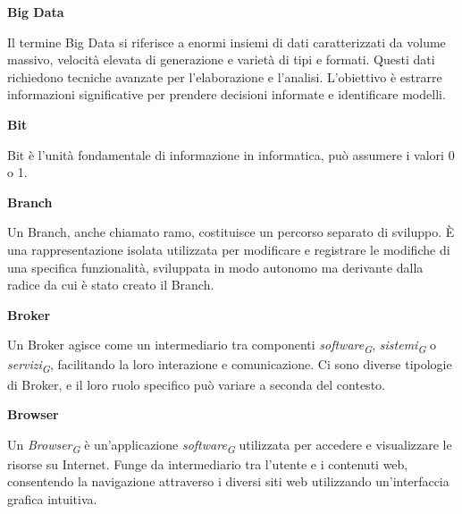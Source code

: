 \documentclass{article}
\begin{document}
\vspace{0.4cm}

\textbf{Big Data}

\vspace{0.1cm}

Il termine Big Data si riferisce a enormi insiemi di dati caratterizzati da volume massivo, velocità elevata di generazione e varietà di tipi e formati. Questi dati richiedono tecniche avanzate per l'elaborazione e l'analisi. L'obiettivo è estrarre informazioni significative per prendere decisioni informate e identificare modelli.

\vspace{0.4cm}

\textbf{Bit}

\vspace{0.1cm}

Bit è l'unità fondamentale di informazione in informatica, può assumere i valori 0 o 1. 

\vspace{0.4cm}

\textbf{Branch}

\vspace{0.1cm}

Un Branch, anche chiamato ramo, costituisce un percorso separato di sviluppo. È una rappresentazione isolata utilizzata per modificare e registrare le modifiche di una specifica funzionalità, sviluppata in modo autonomo ma derivante dalla radice da cui è stato creato il Branch.

\vspace{0.4cm}

\textbf{Broker}

\vspace{0.1cm}

Un Broker agisce come un intermediario tra componenti \textit{software}\textsubscript{\textit{G}}, \textit{sistemi}\textsubscript{\textit{G}} o \textit{servizi}\textsubscript{\textit{G}}, facilitando la loro interazione e comunicazione. Ci sono diverse tipologie di Broker, e il loro ruolo specifico può variare a seconda del contesto.

\vspace{0.4cm}

\textbf{Browser}

\vspace{0.1cm}

Un \textit{Browser}\textsubscript{\textit{G}} è un'applicazione \textit{software}\textsubscript{\textit{G}} utilizzata per accedere e visualizzare le risorse su Internet. Funge da intermediario tra l'utente e i contenuti web, consentendo la navigazione attraverso i diversi siti web utilizzando un'interfaccia grafica intuitiva. 
\end{document}
